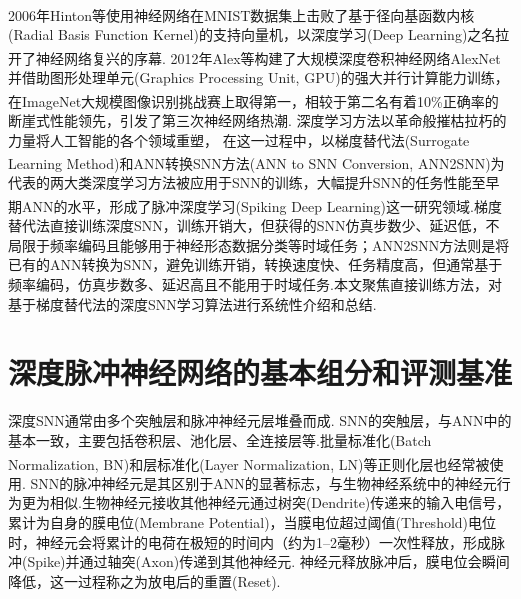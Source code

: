 \documentclass[10.5pt,compsoc,UTF8]{CjC}
\theoremstyle{mystyle}
\newcommand{\upcite}[1]{\textsuperscript{\cite{#1}}}
\begin{document}
\begin{multicols}{1}
2006年Hinton等\upcite{10.1162/neco.2006.18.7.1527}使用神经网络在MNIST数据集\upcite{MNIST}上击败了基于径向基函数内核(Radial Basis Function Kernel)的支持向量机，以深度学习(Deep Learning)之名拉开了神经网络复兴的序幕\upcite{Goodfellow-et-al-2016}.
2012年Alex等\upcite{NIPS2012_c399862d}构建了大规模深度卷积神经网络AlexNet并借助图形处理单元(Graphics Processing Unit, GPU)的强大并行计算能力训练，在ImageNet大规模图像识别挑战赛\upcite{russakovsky2015imagenet}上取得第一，相较于第二名有着10\%正确率的断崖式性能领先，引发了第三次神经网络热潮.
深度学习方法以革命般摧枯拉朽的力量将人工智能的各个领域重塑，%
在这一过程中，以梯度替代法(Surrogate Learning Method)\upcite{neftci2019surrogate}和ANN转换SNN方法(ANN to SNN Conversion, ANN2SNN)\upcite{cao2015spiking}为代表的两大类深度学习方法被应用于SNN的训练，大幅提升SNN的任务性能至早期ANN的水平\upcite{TAVANAEI201947}，形成了脉冲深度学习(Spiking Deep Learning)这一研究领域.梯度替代法直接训练深度SNN，训练开销大，但获得的SNN仿真步数少、延迟低，不局限于频率编码且能够用于神经形态数据分类等时域任务；ANN2SNN方法则是将已有的ANN转换为SNN，避免训练开销，转换速度快、任务精度高，但通常基于频率编码，仿真步数多、延迟高且不能用于时域任务.本文聚焦直接训练方法，对基于梯度替代法的深度SNN学习算法进行系统性介绍和总结.

\section{深度脉冲神经网络的基本组分和评测基准}
深度SNN通常由多个突触层和脉冲神经元层堆叠而成.
SNN的突触层，与ANN中的基本一致，主要包括卷积层、池化层、全连接层等.批量标准化(Batch Normalization, BN)\upcite{ioffe2015batch}和层标准化(Layer Normalization, LN)\upcite{ba2016layer}等正则化层也经常被使用.
SNN的脉冲神经元是其区别于ANN的显著标志，与生物神经系统中的神经元行为更为相似.生物神经元接收其他神经元通过树突(Dendrite)传递来的输入电信号，累计为自身的膜电位(Membrane Potential)，当膜电位超过阈值(Threshold)电位时，神经元会将累计的电荷在极短的时间内（约为1--2毫秒）一次性释放，形成脉冲(Spike)并通过轴突(Axon)传递到其他神经元.
神经元释放脉冲后，膜电位会瞬间降低，这一过程称之为放电后的重置(Reset).


\end{multicols}
\end{document}
